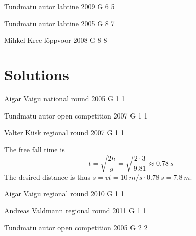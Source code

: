 \documentclass[11pt]{article}
\begin{document}
{Tundmatu autor} %
{lahtine} %
{2009} %
{G 6} %
{5} %
{

\ifEngHint
\fi
}

{Tundmatu autor} %
{lahtine} %
{2005} %
{G 8} %
{7} %
{

\ifEngHint
\fi
}

{Mihkel Kree} %
{lõppvoor} %
{2008} %
{G 8} %
{8} %
{

\ifEngHint
\fi
}
\newpage\section{Solutions}
        \ToggleEngSolution
        
{Aigar Vaigu} %
{national round} %
{2005} %
{G 1} %
{1} %
{

\ifEngSolution
\fi
}

\ylDisplay{} %
{Tundmatu autor} %
{open competition} %
{2007} %
{G 1} %
{1} %
{

\ifEngSolution
\fi
}

{Valter Kiisk} %
{regional round} %
{2007} %
{G 1} %
{1} %
{

\ifEngSolution
The free fall time is 
\[
t=\sqrt{\frac{2 h}{g}}=\sqrt{\frac{2 \cdot 3}{\num{9,81}}} \approx \SI{0,78}{s}
\]
The desired distance is thus $s = vt = \SI{10}{m/s} \cdot \SI{0,78}{s} = \SI{7,8}{m}$.
\fi
}

\ylDisplay{} %
{Aigar Vaigu} %
{regional round} %
{2010} %
{G 1} %
{1} %
{

\ifEngSolution
\fi
}

\ylDisplay{} %
{Andreas Valdmann} %
{regional round} %
{2011} %
{G 1} %
{1} %
{

\ifEngSolution
\fi
}

\ylDisplay{} %
{Tundmatu autor} %
{open competition} %
{2005} %
{G 2} %
{2} %
{

\ifEngSolution
\fi
}
\end{document}
